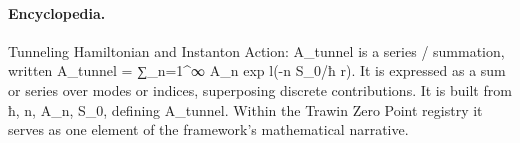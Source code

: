 \paragraph{Encyclopedia.}
Tunneling Hamiltonian and Instanton Action: A\_tunnel is a series / summation, written A\_tunnel = ∑\_n=1\textasciicircum{}∞ A\_n exp l(-n S\_0/ħ r). It is expressed as a sum or series over modes or indices, superposing discrete contributions. It is built from ħ, n, A\_n, S\_0, defining A\_tunnel. Within the Trawin Zero Point registry it serves as one element of the framework's mathematical narrative.
